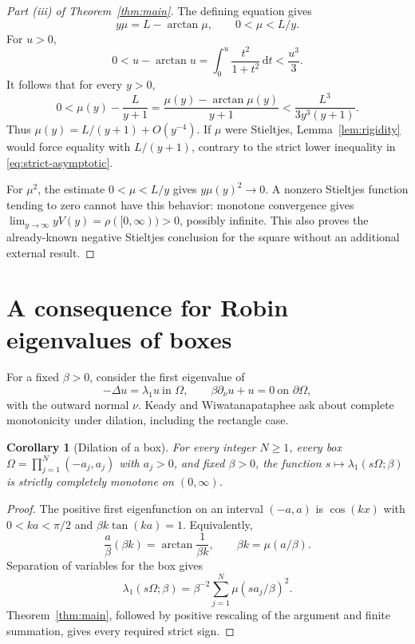\documentclass[11pt,a4paper]{article}
\newtheorem{corollary}[theorem]{Corollary}
\theoremstyle{definition}\newtheorem{definition}[theorem]{Definition}
\theoremstyle{remark}\newtheorem{remark}[theorem]{Remark}
\newcommand{\dd}{\,\mathrm d}
\begin{document}
\begin{proof}[Part (iii) of Theorem~\ref{thm:main}]
The defining equation gives
\[
 y\mu=L-\arctan\mu,\qquad 0<\mu<L/y.
\]
For $u>0$,
\[
 0<u-\arctan u=\int_0^u\frac{t^2}{1+t^2}\dd t<\frac{u^3}{3}.
\]
It follows that for every $y>0$,
\begin{equation}\label{eq:strict-asymptotic}
 0<\mu(y)-\frac L{y+1}
   =\frac{\mu(y)-\arctan\mu(y)}{y+1}
   <\frac{L^3}{3y^3(y+1)}.
\end{equation}
Thus $\mu(y)=L/(y+1)+O(y^{-4})$. If $\mu$ were Stieltjes,
Lemma~\ref{lem:rigidity} would force equality with $L/(y+1)$,
contrary to the strict lower inequality in
\eqref{eq:strict-asymptotic}.

For $\mu^2$, the estimate $0<\mu<L/y$ gives
$y\mu(y)^2\to0$. A nonzero Stieltjes function tending to zero
cannot have this behavior: monotone convergence gives
$\lim_{y\to\infty}yV(y)=\rho([0,\infty))>0$, possibly infinite.
This also proves the already-known negative Stieltjes conclusion
for the square without an additional external result.
\end{proof}

\section{A consequence for Robin eigenvalues of boxes}

For a fixed $\beta>0$, consider the first eigenvalue of
\[
 -\Delta u=\lambda_1 u\ \text{in }\Omega,\qquad
 \beta\partial_\nu u+u=0\ \text{on }\partial\Omega,
\]
with the outward normal $\nu$. Keady and Wiwatanapataphee
\cite[Section~6, pp.~924--925]{KW2018} ask about complete
monotonicity under dilation, including the rectangle case.

\begin{corollary}[Dilation of a box]\label{cor:Robin}
For every integer $N\ge1$, every box
$\Omega=\prod_{j=1}^N(-a_j,a_j)$ with $a_j>0$, and fixed
$\beta>0$, the function
$s\mapsto\lambda_1(s\Omega;\beta)$ is strictly completely
monotone on $(0,\infty)$.
\end{corollary}

\begin{proof}
The positive first eigenfunction on an interval $(-a,a)$ is
$\cos(kx)$ with $0<ka<\pi/2$ and
$\beta k\tan(ka)=1$. Equivalently,
\[
 \frac a\beta(\beta k)=\arctan\frac1{\beta k},
 \qquad \beta k=\mu(a/\beta).
\]
Separation of variables for the box gives
\begin{equation}\label{eq:Robin-box}
 \lambda_1(s\Omega;\beta)
 =\beta^{-2}\sum_{j=1}^N\mu(sa_j/\beta)^2.
\end{equation}
Theorem~\ref{thm:main}, followed by positive rescaling of the
argument and finite summation, gives every required strict sign.
\end{proof}
\end{document}
